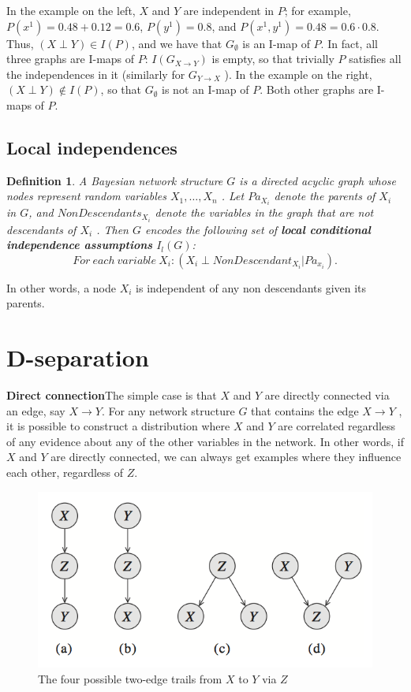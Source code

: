 \documentclass[twoside]{article}
\newtheorem{Defn}{Definition}[section]
\begin{document}
In the example on the left, \(X\) and \(Y\) are independent in \(P\); for example, \(P(x^1) = 0.48 + 0.12 = 0.6\), \(P(y^1) = 0.8\), and \(P(x^1, y^1) = 0.48 = 0.6 · 0.8\). Thus, \((X \perp Y ) \in I(P)\), and we have that \(G_\emptyset\) is an I-map of \(P\). In fact, all three graphs are I-maps of \(P\): \(I(G_{X\rightarrow Y})\) is empty, so that trivially \(P\) satisfies all the independences in it (similarly for \(G_{Y\rightarrow X}\) ). In the example on the right, \((X \perp Y) \not\in I(P)\), so that \(G_\emptyset\) is not an I-map of \(P\). Both other graphs are I-maps of \(P\).

\subsection{Local independences}

\begin{Defn}
A Bayesian network structure \(G\) is a directed acyclic graph whose nodes represent random variables \(X_1,\ldots,X_n\) . Let \(Pa_{X_i}\) denote the parents of \(X_i\) in \(G\), and \(NonDescendants_{X_i}\) denote the variables in the graph that are not descendants of \( X_i\) . Then \(G\) encodes the following set of \textbf{local conditional independence assumptions} \(I_l (G)\):
\[For\ each\ variable\ X_i: (X_i \perp NonDescendant_{X_i} | Pa_{x_i}).\]
\end{Defn}

In other words, a node \(X_i\) is independent of any non descendants given its parents.

\section{D-separation}

\textbf{Direct connection}\quad The simple case is that \(X\) and \(Y\) are directly connected via an edge, say \(X \rightarrow Y\). For any network structure \(G\) that contains the edge \(X \rightarrow Y\) , it is possible to construct a distribution where \(X\) and \(Y\) are correlated regardless of any evidence about any of the other variables in the network. In other words, if \(X\) and \(Y\) are directly connected, we can always get examples where they influence each other, regardless of \(Z\).

\begin{figure}[!bth]
\centering
\includegraphics[width=.6\linewidth]{assets/xyz_trail.png}
\caption{\label{fig:xyz_trail} The four possible two-edge trails from \(X\) to \(Y\) via \(Z\)}
\end{figure}
\end{document}
